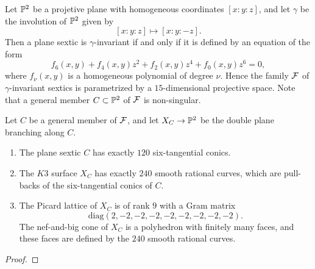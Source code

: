 \documentclass{amsart} %
\newcommand{\XC}{X_C}
\newcommand{\diag}{\mathrm{diag}}
\begin{document}
%
Let $\mathord{\mathbb{P}}^2$ be a projetive plane 
with homogeneous coordinates $[x:y:z]$, and 
let $\gamma$ be the involution of $\mathord{\mathbb{P}}^2$ given by
\[
[x:y:z]\mapsto [x:y:-z].
\]
Then a plane sextic  is  $\gamma$-invariant if and only if it is defined by an equation 
of the form 
\[
f_{6}(x, y)+f_{4}(x, y)z^2+ f_{2}(x, y) z^4+ f_{0}(x, y) z^6=0,
\]
where $f_{\nu} (x, y)$ is a homogeneous polynomial of degree $\nu$.
Hence the family $\mathord{\mathcal{F}}$  of $\gamma$-invariant sextics is parametrized 
by a $15$-dimensional projective space.
Note that a general member $C\subset \mathord{\mathbb{P}}^2$ of $\mathord{\mathcal{F}}$ is non-singular.
%
%
\begin{proposition}
Let $C$ be a  general member of $\mathord{\mathcal{F}}$,
and let $\XC\to \PP^2$ be the double plane branching along $C$.
\begin{enumerate}[label={\rm (\arabic*)}]
\item The plane sextic  $C$ has exactly $120$ six-tangential conics.
\item The $K3$ surface $\XC$ has exactly $240$ smooth rational curves,
which are pull-backs of the six-tangential conics of $C$.
\item The Picard lattice of $\XC$ is of rank $9$
with a Gram matrix 
\[
\diag (2, -2,-2,-2,-2,-2,-2,-2,-2).
\]
The nef-and-big cone of $\XC$ is a polyhedron with finitely many faces, 
and these faces are defined by the $240$ smooth rational curves.
\end{enumerate}
\end{proposition}
%
\begin{proof}
\end{proof}
%
\end{document}
